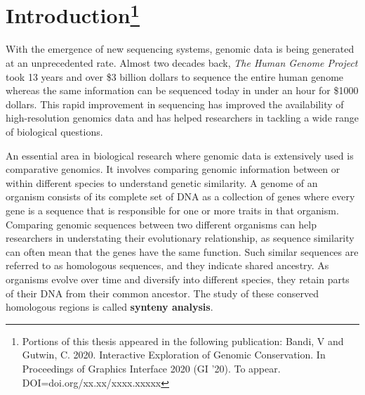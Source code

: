 \chapter[Introduction]{Introduction\footnote{Portions of this thesis appeared in the following publication: Bandi, V and Gutwin, C. 2020. Interactive Exploration of Genomic Conservation. In Proceedings of Graphics Interface 2020 (GI ’20). To appear. DOI=doi.org/xx.xx/xxxx.xxxxx}}

With the emergence of new sequencing systems, genomic data is being generated at an unprecedented rate. Almost two decades back, \textit{The Human Genome Project} took 13 years and over \$3 billion dollars to sequence the entire human genome whereas the same information can be sequenced today in under an hour for \$1000 dollars. This rapid improvement in sequencing has improved the availability of high-resolution genomics data and has helped researchers in tackling a wide range of biological questions.

An essential area in biological research where genomic data is extensively used is comparative genomics. It involves comparing genomic information between or within different species to understand genetic similarity. A genome of an organism consists of its complete set of DNA as a collection of genes where every gene is a sequence that is responsible for one or more traits in that organism. Comparing genomic sequences between two different organisms can help researchers in understating their evolutionary relationship, as sequence similarity can often mean that the genes have the same function. Such similar sequences are referred to as homologous sequences, and they indicate shared ancestry. As organisms evolve over time and diversify into different species, they retain parts of their DNA from their common ancestor. The study of these conserved homologous regions is called \textbf{synteny analysis}. 

